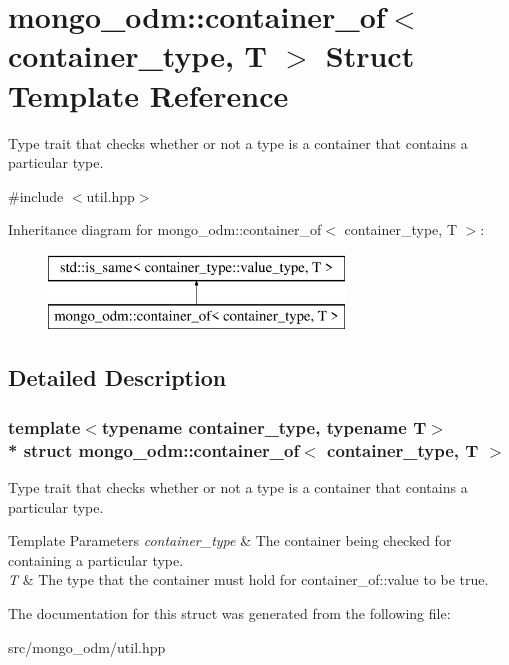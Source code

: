 \hypertarget{structmongo__odm_1_1container__of}{}\section{mongo\+\_\+odm\+:\+:container\+\_\+of$<$ container\+\_\+type, T $>$ Struct Template Reference}
\label{structmongo__odm_1_1container__of}


Type trait that checks whether or not a type is a container that contains a particular type.  




{\ttfamily \#include $<$util.\+hpp$>$}

Inheritance diagram for mongo\+\_\+odm\+:\+:container\+\_\+of$<$ container\+\_\+type, T $>$\+:\begin{figure}[H]
\begin{center}
\leavevmode
\includegraphics[height=2.000000cm]{structmongo__odm_1_1container__of}
\end{center}
\end{figure}


\subsection{Detailed Description}
\subsubsection*{template$<$typename container\+\_\+type, typename T$>$\\*
struct mongo\+\_\+odm\+::container\+\_\+of$<$ container\+\_\+type, T $>$}

Type trait that checks whether or not a type is a container that contains a particular type. 


\begin{DoxyTemplParams}{Template Parameters}
{\em container\+\_\+type} & The container being checked for containing a particular type. \\
\hline
{\em T} & The type that the container must hold for container\+\_\+of\+::value to be true. \\
\hline
\end{DoxyTemplParams}


The documentation for this struct was generated from the following file\+:\begin{DoxyCompactItemize}
\item 
src/mongo\+\_\+odm/util.\+hpp\end{DoxyCompactItemize}
